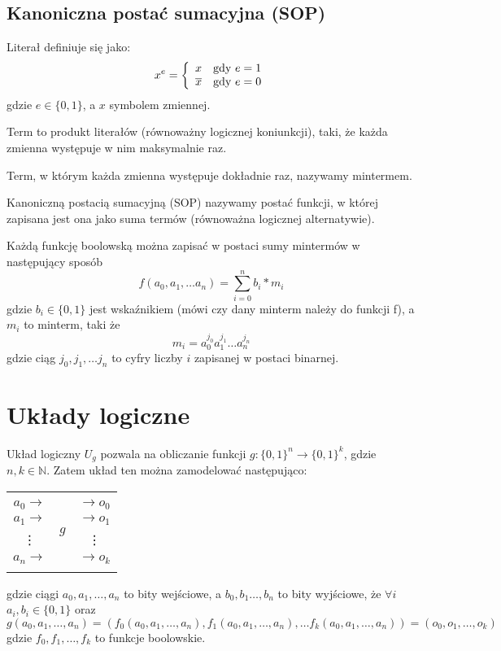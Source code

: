 \subsection{Kanoniczna postać sumacyjna (SOP)}
\begin{definition}
Literał definiuje się jako:
$$
x^e = \left\{ \begin{array}{ll}
x & \textrm{gdy $ e = 1$}\\
\overline{x} & \textrm{gdy $ e = 0 $}
\end{array} \right.
$$
gdzie $e \in \{0, 1\}$, a $x$ symbolem zmiennej.
\end{definition}
\begin{definition}
    Term to produkt literałów (równoważny logicznej koniunkcji), taki, że każda zmienna występuje w nim maksymalnie raz.
\end{definition}
\begin{definition}
    Term, w którym każda zmienna występuje dokładnie raz, nazywamy mintermem.
\end{definition}
\begin{definition}
    Kanoniczną postacią sumacyjną (SOP) nazywamy postać funkcji, w której zapisana jest ona jako suma termów (równoważna logicznej alternatywie).
\end{definition}
Każdą funkcję boolowską można zapisać w postaci sumy mintermów w następujący sposób
\[f(a_0, a_1, \ldots a_n) = \sum_{i=0}^n b_i*m_i\]
gdzie $b_i \in \{0, 1\}$ jest wskaźnikiem (mówi czy dany minterm należy do funkcji f), a $m_i$ to minterm, taki że
\[m_i = a_0^{j_0}a_1^{j_1} \ldots a_n^{j_n}\]
gdzie ciąg $j_0, j_1, \ldots j_n$ to cyfry liczby $i$ zapisanej w postaci binarnej.
\section{Układy logiczne}
Układ logiczny $U_g$ pozwala na obliczanie funkcji $g: \{0,1\}^n \rightarrow \{0,1\}^k$, gdzie $n,k \in \mathbb{N}$. Zatem układ ten można zamodelować następująco:
\begin{center}
    \begin{tabular}{ c | c | c }
        \cline{2-2}
        & & \\
        $a_0 \rightarrow$ & \multirow{4}{5cm}{\centering$g$ 
        } & $\rightarrow o_0 $
        \\
        $a_1 \rightarrow$ &  & $\rightarrow o_1 $
        \\
        \vdots & & \vdots\\
        $a_n \rightarrow$ & & $\rightarrow o_k $
        \\
        & & \\
        \cline{2-2}
    \end{tabular} 
\end{center}
gdzie ciągi $a_0, a_1, \ldots, a_n$ to bity wejściowe, a $b_0, b_1 \ldots, b_n$ to bity wyjściowe, że $\forall i$ $a_i, b_i \in \{0, 1\}$ oraz
\[g(a_0, a_1, \ldots, a_n) = (f_0(a_0, a_1, \ldots, a_n), f_1(a_0, a_1, \ldots, a_n), \ldots f_k(a_0, a_1, \ldots, a_n)) =  (o_0, o_1, \ldots, o_k)\]
gdzie $f_0, f_1, \ldots, f_k$ to funkcje boolowskie.
